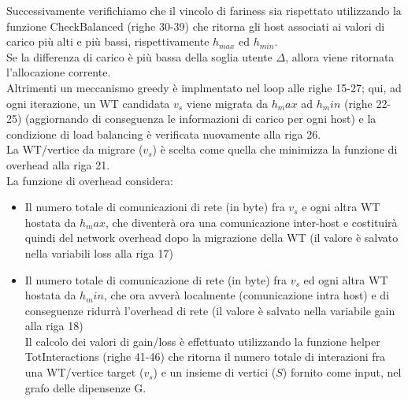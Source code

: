 \documentclass[11pt]{article}
\begin{document}
		Successivamente verifichiamo che il vincolo di fariness sia rispettato utilizzando la funzione CheckBalanced (righe 30-39) che ritorna gli host associati ai valori di carico più alti e più bassi, rispettivamente $h_{max}$ ed $h_{min}$.\\
		Se la differenza di carico è più bassa della soglia utente $\Delta$, allora viene ritornata l'allocazione corrente.\\
		Altrimenti un meccanismo greedy è implmentato nel loop alle righe 15-27; qui, ad ogni iterazione, un WT candidata $v_s$ viene migrata da $h_max$ ad $h_min$ (righe 22-25) (aggiornando di conseguenza le informazioni di carico per ogni host) e la condizione di load balancing è verificata nuovamente alla riga 26. \\
		La WT/vertice da migrare ($v_s$) è scelta come quella che minimizza la funzione di overhead alla riga 21. \\
		La funzione di overhead considera:
		\begin{itemize}
			\item Il numero totale di comunicazioni di rete (in byte) fra $v_s$ e ogni altra WT hostata da $h_max$, che diventerà ora una comunicazione inter-host e costituirà quindi del network overhead dopo la migrazione della WT (il valore è salvato nella variabili loss alla riga 17)
			\item Il numero totale di comunicazione di rete (in byte) fra $v_s$ ed ogni altra WT hostata da $h_min$, che ora avverà localmente (comunicazione intra host) e di conseguenze ridurrà l'overhead di rete (il valore è salvato nella variabile gain alla riga 18) \\
			Il calcolo dei valori di gain/loss è effettuato utilizzando la funzione helper TotInteractions (righe 41-46) che ritorna il numero totale di interazioni fra una WT/vertice target ($v_s$) e un insieme di vertici ($S$) fornito come input, nel grafo delle dipensenze G.
		\end{itemize}
\end{document}
